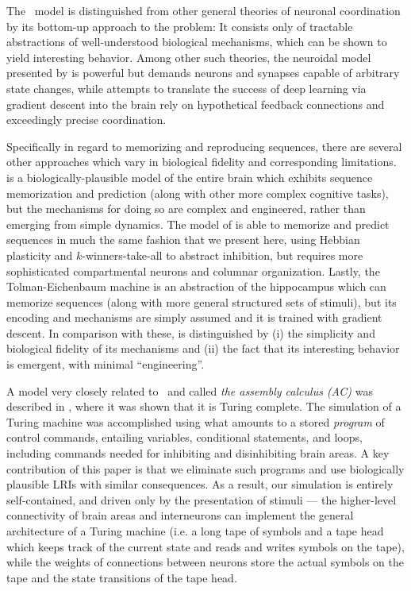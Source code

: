 \documentclass[12pt,nosubfloats]{alt2024} %
\newcommand{\1}{\mathbbm{1}}
\begin{document}
The \name\ model is distinguished from other general theories of neuronal coordination by its bottom-up approach to the problem: It consists only of tractable abstractions of well-understood biological mechanisms, which can be shown to yield interesting behavior.
Among other such theories, the neuroidal model presented by \citet{valiant2000circuits, valiant2000neuroidal, feldman2009experience} is powerful but demands neurons and synapses capable of arbitrary state changes, while attempts to translate the success of deep learning via gradient descent into the brain \citep{lillicrap2016random, sacramento2017dendritic, guerguiev2017towards, sacramento2018dendritic, whittington2019theories, lillicrap2020backpropagation} rely on hypothetical feedback connections and exceedingly precise coordination.

Specifically in regard to memorizing and reproducing sequences, there are several other approaches which vary in biological fidelity and corresponding limitations. \citet{eliasmith2012large} is a biologically-plausible model of the entire brain which exhibits sequence memorization and prediction (along with other more complex cognitive tasks), but the mechanisms for doing so are complex and engineered, rather than emerging from simple dynamics. The model of \citet{cui2016continuous} is able to memorize and predict sequences in much the same fashion that we present here, using Hebbian plasticity and $k$-winners-take-all to abstract inhibition, but requires more sophisticated compartmental neurons and columnar organization. Lastly, the Tolman-Eichenbaum machine \citep{whittington2020tolman} is an abstraction of the hippocampus which can memorize sequences (along with more general structured sets of stimuli), but its encoding and mechanisms are simply assumed and it is trained with gradient descent. In comparison with these, \name is distinguished by (i) the simplicity and biological fidelity of its mechanisms and (ii) the fact that its interesting behavior is emergent, with minimal ``engineering''. 

A model very closely related to \name\ and called {\em the assembly calculus (AC)} was described in \citet{papadimitriou2020brain}, where it was shown that it is Turing complete.  The simulation of a Turing machine was accomplished using what amounts to a stored {\em program} of control commands, entailing variables, conditional statements, and loops, including commands needed for inhibiting and disinhibiting brain areas. A key contribution of this paper is that we eliminate such programs and use biologically plausible LRIs with similar consequences. As a result, our simulation is entirely self-contained, and driven only by the presentation of stimuli --- the higher-level connectivity of brain areas and interneurons can implement the general architecture of a Turing machine (i.e. a long tape of symbols and a tape head which keeps track of the current state and reads and writes symbols on the tape), while the weights of connections between neurons store the actual symbols on the tape and the state transitions of the tape head. 
\end{document}
